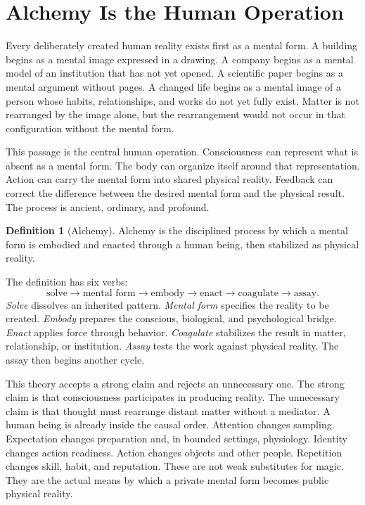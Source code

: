 \documentclass[11pt]{article}
\theoremstyle{plain}
\theoremstyle{definition}
\newtheorem{definition}[theorem]{Definition}
\begin{document}
\newpage
{}

\section{Alchemy Is the Human Operation}

Every deliberately created human reality exists first as a mental form. A building
begins as a mental image expressed in a drawing. A company begins as a mental model of
an institution that has not yet opened. A scientific paper begins as a mental
argument without pages. A changed life begins as a mental image of a person whose
habits, relationships, and works do not yet fully exist. Matter is not rearranged by
the image alone, but the rearrangement would not occur in that configuration without
the mental form.

This passage is the central human operation. Consciousness can represent what is
absent as a mental form. The body can organize itself around that representation.
Action can carry the mental form into shared physical reality. Feedback can correct
the difference between the desired mental form and the physical result. The process
is ancient, ordinary, and profound.

\begin{definition}[Alchemy]
Alchemy is the disciplined process by which a mental form is embodied and enacted
through a human being, then stabilized as physical reality.
\end{definition}

The definition has six verbs:
\[
\text{solve}\rightarrow\text{mental form}\rightarrow\text{embody}
\rightarrow\text{enact}\rightarrow\text{coagulate}\rightarrow\text{assay}.
\]
\emph{Solve} dissolves an inherited pattern. \emph{Mental form} specifies the reality
to be created. \emph{Embody} prepares the conscious, biological, and psychological
bridge. \emph{Enact} applies force through behavior. \emph{Coagulate} stabilizes the
result in matter, relationship, or institution. \emph{Assay} tests the work against
physical reality. The assay then begins another cycle.

This theory accepts a strong claim and rejects an unnecessary one. The strong claim is
that consciousness participates in producing reality. The unnecessary claim is that
thought must rearrange distant matter without a mediator. A human being is already
inside the causal order. Attention changes sampling. Expectation changes preparation
and, in bounded settings, physiology. Identity changes action readiness. Action
changes objects and other people. Repetition changes skill, habit, and reputation.
These are not weak substitutes for magic. They are the actual means by which a private
mental form becomes public physical reality.
\end{document}
